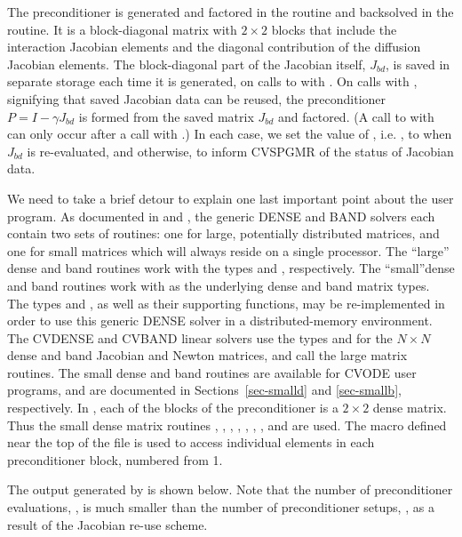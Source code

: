 The preconditioner is generated and factored in the 
routine and backsolved in the  routine.  
It is a block-diagonal matrix with $2 \times 2$ blocks that include the
interaction Jacobian elements and the diagonal contribution of the
diffusion Jacobian elements.  The block-diagonal part of the Jacobian
itself, $J_{bd}$, is saved in separate storage each time it is
generated, on calls to  with .
On calls with , signifying that saved Jacobian data
can be reused, the preconditioner $P = I - \gamma J_{bd}$ is formed from the
saved matrix $J_{bd}$ and factored.  (A call to  with
 can only occur after a call with
.) In each case, we set the value of , i.e.
, to  when $J_{bd}$ is re-evaluated,
and  otherwise, to inform CVSPGMR of the status of Jacobian data.

We need to take a brief detour to explain one last important point about
the  user program. As documented in  and ,
the generic DENSE and BAND solvers each contain two sets of routines: one
for large, potentially distributed matrices, and one for small matrices which
will always reside on a single processor. The ``large'' dense and band
routines work with the types  and , respectively.
The ``small''dense and band routines work with  as the
underlying dense and band matrix types. The types  and 
, as well as their supporting functions, may be re-implemented
in order to use this generic DENSE solver in a distributed-memory
environment. The CVDENSE and CVBAND linear solvers use the types
 and  for the $N \times N$ dense and band
Jacobian and Newton matrices, and call the large matrix routines. 
The small dense and band routines are available for CVODE user
programs, and are documented in Sections~\ref{sec-smalld} and 
\ref{sec-smallb}, respectively.
In , each of the blocks of the preconditioner is a 
$2 \times 2$ dense matrix. Thus the small dense matrix routines
, , , , , 
, , and  are
used.
The macro  defined near
the top of the file is used to access individual elements in each preconditioner 
block, numbered from 1.

The output generated by  is shown below.  Note that the
number of preconditioner evaluations, , is much smaller than
the number of preconditioner setups, , as a result of the
Jacobian re-use scheme.

